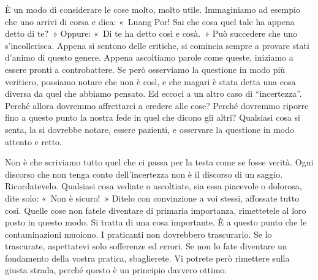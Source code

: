 È un modo di considerare le cose molto, molto utile. Immaginiamo ad
esempio che uno arrivi di corsa e dica: «~Luang Por! Sai che cosa quel
tale ha appena detto di te?~» Oppure: «~Di te ha detto così e cosà.~»
Può succedere che uno s'incollerisca. Appena si sentono delle critiche,
si comincia sempre a provare stati d'animo di questo genere. Appena
ascoltiamo parole come queste, iniziamo a essere pronti a controbattere.
Se però osserviamo la questione in modo più veritiero, possiamo notare
che non è così, e che magari è stata detta una cosa diversa da quel che
abbiamo pensato. Ed eccoci a un altro caso di ``incertezza''. Perché
allora dovremmo affrettarci a credere alle cose? Perché dovremmo riporre
fino a questo punto la nostra fede in quel che dicono gli altri?
Qualsiasi cosa si senta, la si dovrebbe notare, essere pazienti, e
osservare la questione in modo attento e retto.

Non è che scriviamo tutto quel che ci passa per la testa come se fosse
verità. Ogni discorso che non tenga conto dell'incertezza non è il
discorso di un saggio. Ricordatevelo. Qualsiasi cosa vediate o
ascoltiate, sia essa piacevole o dolorosa, dite solo: «~Non è sicuro!~»
Ditelo con convinzione a voi stessi, affossate tutto così. Quelle cose
non fatele diventare di primaria importanza, rimettetele al loro posto
in questo modo. Si tratta di una cosa importante. È a questo punto che
le contaminazioni muoiono. I praticanti non dovrebbero trascurarlo. Se
lo trascurate, aspettatevi solo sofferenze ed errori. Se non lo fate
diventare un fondamento della vostra pratica, sbaglierete. Vi potrete
però rimettere sulla giusta strada, perché questo è un principio davvero
ottimo.

